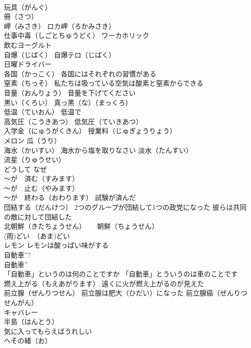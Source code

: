 \documentclass[8pt]{extreport}
\begin{document}
\begin{CJK}{UTF8}{min}
\\	玩具（がんぐ）　
\\	冊（さつ）
\\	岬（みさき） ロカ岬（ろかみさき）
\\	仕事中毒（しごとちゅうどく） ワーカホリック
\\	飲むヨーグルト
\\	自爆（じばく） 自爆テロ（じばく）
\\	日曜ドライバー
\\	各国（かっこく） 各国にはそれぞれの習慣がある
\\	窒素（ちっそ） 私たちは吸っている空気は酸素と窒素からできる
\\	音量（おんりょう） 音量を下げてください
\\	黒い（くろい） 真っ黒（な）（まっくろ）
\\	低温（ていおん） 低温で
\\	高気圧（こうきあつ） 低気圧（ていきあつ）
\\	入学金（にゅうがくきん） 授業料（じゅぎょうりょう）
\\	メロン 瓜（うり）
\\	海水（かいすい） 海水から塩を取りなさい 淡水（たんすい）
\\	流星（りゅうせい）
\\	どうして なぜ
\\	～が　済む（すみます）
\\	～が　止む（やみます）
\\	～が　終わる（おわります） 試験が済んだ
\\	団結する（だんけつ） 2つのグループが団結して1つの政党になった 彼らは共同の敵に対して団結した
\\	北朝鮮（きたちょうせん） 　 朝鮮（ちょうせん）
\\	(雨)どい　（あま)どい
\\	レモン レモンは酸っぱい味がする
\\	自動車”? 
\\	自動車” 
\\	「自動車」というのは何のことですか 「自動車」とういうのは車のことです
\\	燃え上がる（もえあがります） 遠くに火が燃え上がるのが見えた
\\	前立腺（ぜんりつせん） 前立腺は肥大（ひだい）になった 前立腺癌（ぜんりつせんがん）
\\	キャバレー
\\	半島（はんとう）
\\	気に入ってもらえばうれしい
\\	へその緒（お）

\end{CJK}
\end{document}
